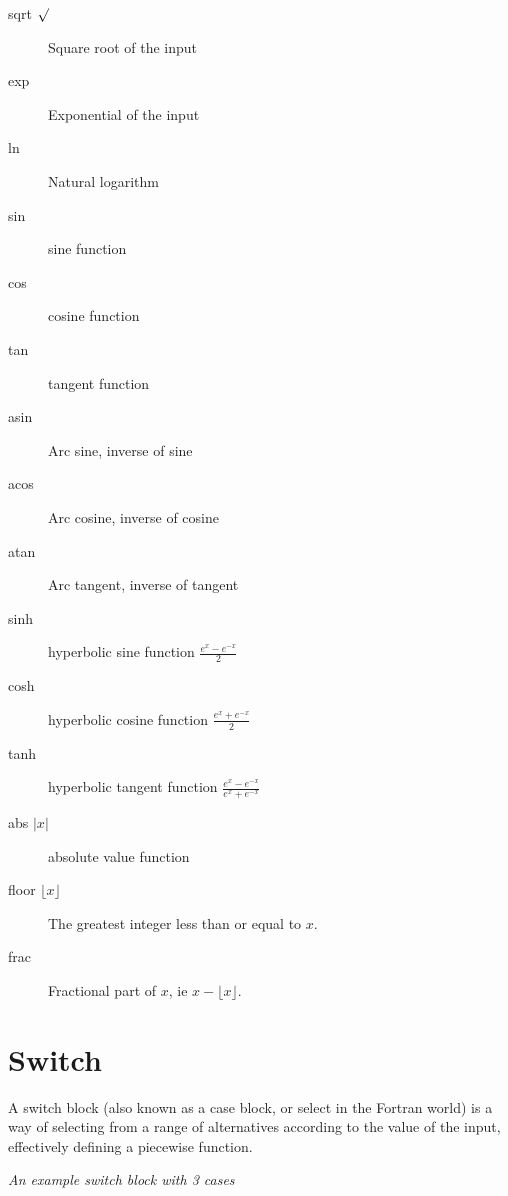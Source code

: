 \begin{description}
\item[sqrt $\surd$]\label{Operation:sqrt} Square root of the input

\item[exp]\label{Operation:exp} Exponential of the input

\item[ln]\label{Operation:ln} Natural logarithm

\item[sin]\label{Operation:sin} sine function
\item[cos]\label{Operation:cos} cosine function
\item[tan]\label{Operation:tan} tangent function
\item[asin]\label{Operation:asin} Arc sine, inverse of sine
\item[acos]\label{Operation:acos} Arc cosine, inverse of cosine
\item[atan]\label{Operation:atan} Arc tangent, inverse of tangent
\item[sinh]\label{Operation:sinh} hyperbolic sine function $\frac{e^x-e^{-x}}2$
\item[cosh]\label{Operation:cosh} hyperbolic cosine function $\frac{e^x+e^{-x}}2$
\item[tanh]\label{Operation:tanh} hyperbolic tangent function $\frac{e^x-e^{-x}}{e^x+e^{-x}}$
\item[abs $|x|$]\label{Operation:abs} absolute value function
\item[floor $\lfloor x\rfloor$]\label{Operation:floor} The greatest integer
  less than or equal to $x$.
\item[frac]\label{Operation:frac} Fractional part of $x$, ie $x-\lfloor x\rfloor$. 

\end{description}

\section{Switch}\label{SwitchIcon}

A switch block (also known as a case block, or select in the Fortran
world) is a way of selecting from a range of alternatives according
to the value of the input, effectively defining a piecewise function.

\begin{center}
{\em An example switch block with 3 cases}
\end{center}

